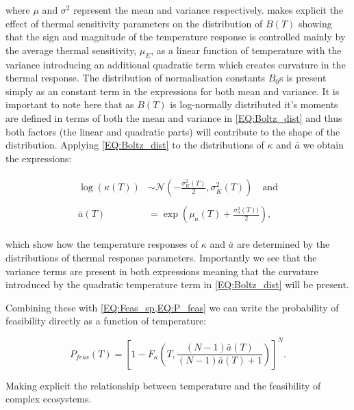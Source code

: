 \documentclass{article}
\begin{document}
where $\mu$ and $\sigma^2$ represent the mean and variance respectively.  makes explicit the effect of thermal sensitivity parameters on the distribution of $B(T)$ showing that the sign and magnitude of the temperature response is controlled mainly by the average thermal sensitivity, $\mu_E$, as a linear function of temperature with the variance introducing an additional quadratic term which creates curvature in the thermal response. The distribution of normalisation constants $B_0$s is present simply as an constant term in the expressions for both mean and variance. It is important to note here that as $B(T)$ is log-normally distributed it's moments are defined in terms of both the mean and variance in \cref{EQ:Boltz_dist} and thus both factors (the linear and quadratic parts) will contribute to the shape of the distribution. Applying \cref{EQ:Boltz_dist} to the distributions of $\kappa$ and $\bar{a}$ we obtain the expressions:

\begin{align} \label{EQ:Trait_distributions}
    \begin{array}{cc}
        \log(\kappa(T)) &\sim \mathcal{N}\left( -\frac{\sigma_{K}^2(T)}{2} , \sigma_{K}^2(T) \right) \quad \text{and} \\ \\
        \bar{a}(T) &= \exp \left(\mu_a(T) + \frac{\sigma_a^2(T))}{2} \right),
    \end{array}
\end{align}

which show how the temperature responses of $\kappa$ and $\bar{a}$ are determined by the distributions of thermal response parameters. Importantly we see that the variance terms are present in both expressions meaning that the curvature introduced by the quadratic temperature term in \cref{EQ:Boltz_dist} will be present. 

Combining these with \cref{EQ:Feas_sp,EQ:P_feas} we can write the probability of feasibility directly as a function of temperature:

\begin{equation} \label{EQ:P_feas_Temp}
    P_{feas}(T) = \left[1 - F_{\kappa}\left(T , \frac{(N-1)\bar{a}(T)}{(N-1)\bar{a}(T) + 1} \right) \right]^N.
\end{equation}

Making explicit the relationship between temperature and the feasibility of complex ecosystems. 
\end{document}

